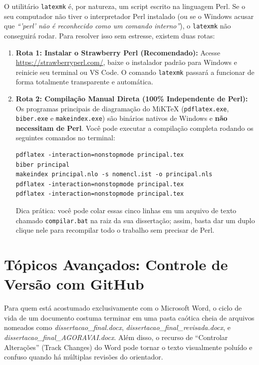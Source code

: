 \documentclass[a4paper,12pt]{article}
\begin{document}
\begin{atencao}
O utilitário \texttt{latexmk} é, por natureza, um script escrito na linguagem Perl. Se o seu computador não tiver o interpretador Perl instalado (ou se o Windows acusar que \textit{``'perl' não é reconhecido como um comando interno''}), o \texttt{latexmk} não conseguirá rodar. Para resolver isso sem estresse, existem duas rotas:

\begin{enumerate}
    \item \textbf{Rota 1: Instalar o Strawberry Perl (Recomendado):} Acesse \url{https://strawberryperl.com/}, baixe o instalador padrão para Windows e reinicie seu terminal ou VS Code. O comando \texttt{latexmk} passará a funcionar de forma totalmente transparente e automática.
    \item \textbf{Rota 2: Compilação Manual Direta (100\% Independente de Perl):} Os programas principais de diagramação do MiKTeX (\texttt{pdflatex.exe}, \texttt{biber.exe} e \texttt{makeindex.exe}) são binários nativos de Windows e \textbf{não necessitam de Perl}. Você pode executar a compilação completa rodando os seguintes comandos no terminal:
\begin{verbatim}
pdflatex -interaction=nonstopmode principal.tex
biber principal
makeindex principal.nlo -s nomencl.ist -o principal.nls
pdflatex -interaction=nonstopmode principal.tex
pdflatex -interaction=nonstopmode principal.tex
\end{verbatim}
    Dica prática: você pode colar essas cinco linhas em um arquivo de texto chamado \texttt{compilar.bat} na raiz da sua dissertação; assim, basta dar um duplo clique nele para recompilar todo o trabalho sem precisar de Perl.
\end{enumerate}
\end{atencao}

\section{Tópicos Avançados: Controle de Versão com GitHub}

Para quem está acostumado exclusivamente com o Microsoft Word, o ciclo de vida de um documento costuma terminar em uma pasta caótica cheia de arquivos nomeados como \textit{dissertacao\_final.docx}, \textit{dissertacao\_final\_revisada.docx}, e \textit{dissertacao\_final\_AGORAVAI.docx}. Além disso, o recurso de ``Controlar Alterações'' (Track Changes) do Word pode tornar o texto visualmente poluído e confuso quando há múltiplas revisões do orientador.
\end{document}
